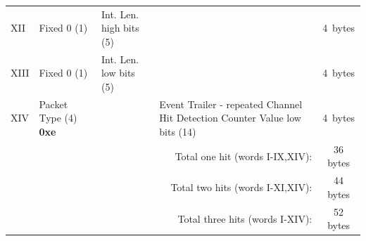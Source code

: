 \documentclass[letterpaper,12pt,notitlepage]{report}
\begin{document}
\begin{landscape}
\begin{table}
\begin{tabular*}{\textwidth}{p{0.9cm}|p{2.25cm}|p{2.2cm}|p{2.2cm}|p{2.2cm}|p{2.2cm}|p{2.2cm}|p{2.2cm}|p{2.2cm}|c}
\cline{2-9}
XII & Fixed 0 (1) & Int. Len. high bits (5) & \multicolumn{6}{p{13.2cm}|}{\centering{Pulse Height 3 (26)}} & 4~bytes\\
\cline{2-9}
XIII & Fixed 0 (1) & Int. Len. low bits (5) & \multicolumn{6}{p{13.2cm}|}{\centering{CFD 3 (26)}} & 4~bytes\\
\cline{2-9}
XIV & Packet Type (4) {\bf 0xe} & \multicolumn{3}{p{6.6cm}|}{\centering{reserved (14)}} & \multicolumn{4}{p{8.8cm}|}{Event Trailer - repeated Channel Hit Detection Counter Value low bits (14)} & 4~bytes\\
\cline{2-9}
\multicolumn{9}{r}{Total one hit (words I-IX,XIV):} & 36 bytes\\
\multicolumn{9}{r}{Total two hits (words I-XI,XIV):} & 44 bytes\\
\multicolumn{9}{r}{Total three hits (words I-XIV):} & 52 bytes\\
\end{tabular*}
\end{table}
\end{landscape}
\end{document}
